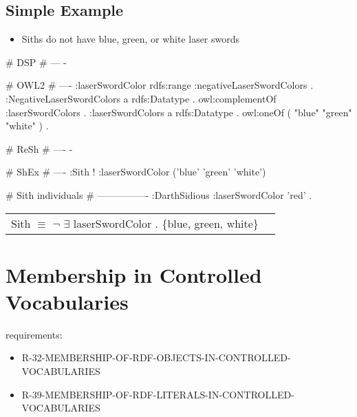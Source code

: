 \documentclass{llncs}
\newenvironment{DL}{
	\begin{center}
  \begin{tabular}{r l}

}{
  \end{tabular}
	\end{center}
}
\newcommand{\tb}[1]{\todo[size=\small, color=blue!40]{\textbf{Thomas:} #1}}
\begin{document}
\subsection{Simple Example}

\begin{itemize}
	\item Siths do not have blue, green, or white laser swords
\end{itemize}

\begin{ex}
# DSP
# ---
-
\end{ex}

\begin{ex}
# OWL2
# ----
:laserSwordColor rdfs:range :negativeLaserSwordColors . 
:NegativeLaserSwordColors
    a rdfs:Datatype .
    owl:complementOf :laserSwordColors .
:laserSwordColors
    a rdfs:Datatype .
    owl:oneOf ( "blue" "green" "white" ) .
\end{ex}

\begin{ex}
# ReSh
# ----
-
\end{ex}

\begin{ex}
# ShEx
# ----
:Sith {
    ! :laserSwordColor ('blue' 'green' 'white') }
\end{ex}

\begin{ex}
# Sith individuals
# ----------------
:DarthSidious
    :laserSwordColor 'red' .
\end{ex}

\begin{DL}
Sith $\equiv$ $\neg$ $\exists$ laserSwordColor . \{blue, green, white\} \\
\end{DL}


\section{Membership in Controlled Vocabularies}

requirements:

\begin{itemize}
	\item R-32-MEMBERSHIP-OF-RDF-OBJECTS-IN-CONTROLLED-VOCABULARIES
	\item R-39-MEMBERSHIP-OF-RDF-LITERALS-IN-CONTROLLED-VOCABULARIES
\end{itemize}
\end{document}
